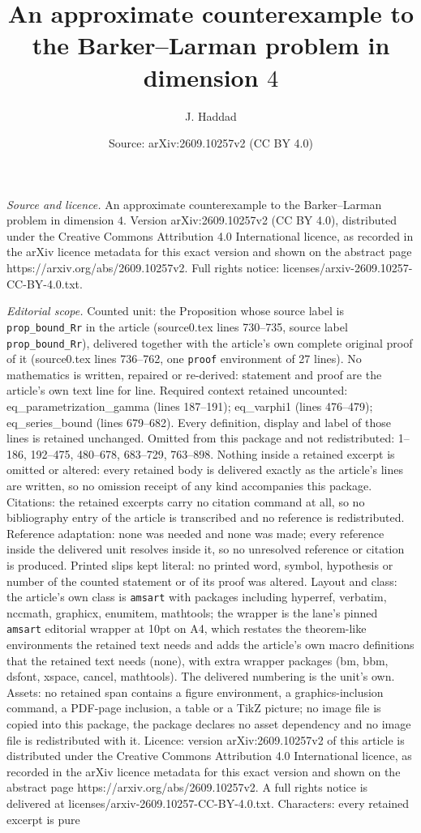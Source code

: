 \documentclass[10pt,a4paper]{amsart}
\title[An approximate counterexample to the Barker--Larman problem ]{An approximate counterexample to the Barker--Larman problem in dimension $4$}
\author{J. Haddad}
\date{Source: arXiv:2609.10257v2 (CC BY 4.0)}
\begin{document}
\maketitle

\noindent\emph{Source and licence.} An approximate counterexample to the Barker--Larman problem in dimension $4$. Version arXiv:2609.10257v2 (CC BY 4.0), distributed under the Creative Commons Attribution 4.0 International licence, as recorded in the arXiv licence metadata for this exact version and shown on the abstract page https://arxiv.org/abs/2609.10257v2. Full rights notice: licenses/arxiv-2609.10257-CC-BY-4.0.txt.\par\smallskip

\noindent\textit{Editorial scope.} Counted unit: the Proposition whose source label is \texttt{prop\_bound\_Rr} in the article (source0.tex lines 730--735, source label \texttt{prop\_bound\_Rr}), delivered together with the article's own complete original proof of it (source0.tex lines 736--762, one \texttt{proof} environment of 27 lines). No mathematics is written, repaired or re-derived: statement and proof are the article's own text line for line. Required context retained uncounted: eq\_parametrization\_gamma (lines 187--191); eq\_varphi1 (lines 476--479); eq\_series\_bound (lines 679--682). Every definition, display and label of those lines is retained unchanged. Omitted from this package and not redistributed: 1--186, 192--475, 480--678, 683--729, 763--898. Nothing inside a retained excerpt is omitted or altered: every retained body is delivered exactly as the article's lines are written, so no omission receipt of any kind accompanies this package. Citations: the retained excerpts carry no citation command at all, so no bibliography entry of the article is transcribed and no reference is redistributed. Reference adaptation: none was needed and none was made; every reference inside the delivered unit resolves inside it, so no unresolved reference or citation is produced. Printed slips kept literal: no printed word, symbol, hypothesis or number of the counted statement or of its proof was altered. Layout and class: the article's own class is \texttt{amsart} with packages including hyperref, verbatim, nccmath, graphicx, enumitem, mathtools; the wrapper is the lane's pinned \texttt{amsart} editorial wrapper at 10pt on A4, which restates the theorem-like environments the retained text needs and adds the article's own macro definitions that the retained text needs (none), with extra wrapper packages (bm, bbm, dsfont, xspace, cancel, mathtools). The delivered numbering is the unit's own. Assets: no retained span contains a figure environment, a graphics-inclusion command, a PDF-page inclusion, a table or a TikZ picture; no image file is copied into this package, the package declares no asset dependency and no image file is redistributed with it. Licence: version arXiv:2609.10257v2 of this article is distributed under the Creative Commons Attribution 4.0 International licence, as recorded in the arXiv licence metadata for this exact version and shown on the abstract page https://arxiv.org/abs/2609.10257v2. A full rights notice is delivered at licenses/arxiv-2609.10257-CC-BY-4.0.txt. Characters: every retained excerpt is pure 
\end{document}
